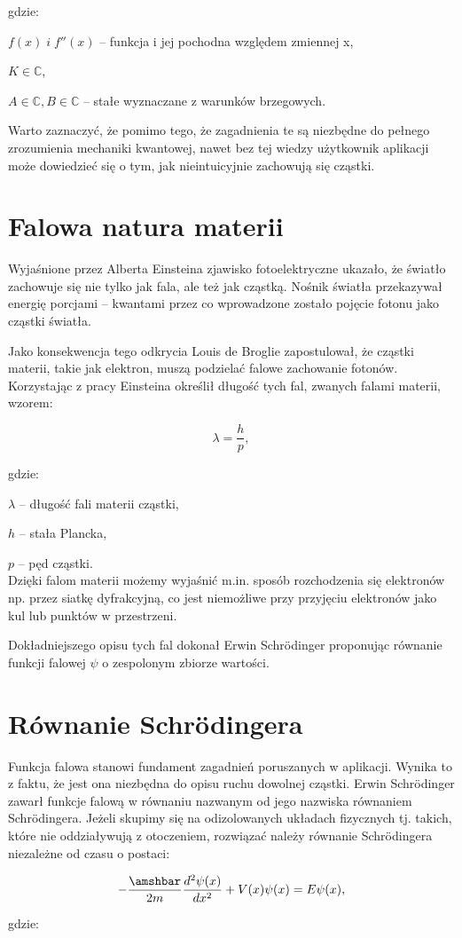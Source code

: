 \documentclass{SGGW-thesis}
\begin{document}
	gdzie:
	
	$f(x) \; i \; f''(x)$ -- funkcja i jej pochodna względem zmiennej x,

	$K \in \mathbb{C}$,
		
	$A \in \mathbb{C}, B \in \mathbb{C}$ -- stałe wyznaczane z warunków brzegowych.
	
	

	Warto zaznaczyć, że pomimo tego, że zagadnienia te są niezbędne do pełnego zrozumienia mechaniki kwantowej, nawet bez tej wiedzy użytkownik aplikacji może dowiedzieć się o tym, jak nieintuicyjnie zachowują się cząstki.
	\section{Falowa natura materii}
	Wyjaśnione przez Alberta Einsteina zjawisko fotoelektryczne ukazało, że światło zachowuje się nie tylko jak fala, ale też jak cząstką\cite{foto-ele}. Nośnik światła przekazywał energię porcjami -- kwantami przez co wprowadzone zostało pojęcie fotonu jako cząstki światła.
	
	 Jako konsekwencja tego odkrycia Louis de Broglie zapostulował, że cząstki materii, takie jak elektron, muszą podzielać falowe zachowanie fotonów. Korzystając z pracy Einsteina określił długość tych fal\cite{matter-wave}, zwanych falami materii, wzorem:
	 
	 \begin{equation}
	 \lambda=\frac{h}{p},
	 \end{equation}
	
	 
	 gdzie:
	 
	 $\lambda$ -- długość fali materii cząstki,
	 
	 $h$ -- stała Plancka,
	 
	 $p$ -- pęd cząstki.\\
	 
	 Dzięki falom materii możemy wyjaśnić m.in. sposób rozchodzenia się elektronów np. przez siatkę dyfrakcyjną, co jest niemożliwe przy przyjęciu elektronów jako kul lub punktów w przestrzeni.
	 
	 Dokładniejszego opisu tych fal dokonał Erwin Schrödinger proponując równanie funkcji falowej $\psi$ o zespolonym zbiorze wartości. 
	 
	\section{Równanie Schrödingera}
	Funkcja falowa stanowi fundament zagadnień poruszanych w aplikacji. Wynika to z faktu, że jest ona niezbędna do opisu ruchu dowolnej cząstki. Erwin Schrödinger zawarł funkcje falową w równaniu nazwanym od jego nazwiska równaniem Schrödingera\cite{schrodinger-equation}.  Jeżeli skupimy się na odizolowanych układach fizycznych tj. takich, które nie oddziaływują z otoczeniem, rozwiązać należy równanie Schrödingera niezależne od czasu o postaci:
	\begin{center}
	\begin{equation}
		-\frac{\amshbar}{2m} \frac{d^2\psi(x)}{dx^2} + V(x)\psi(x) = E\psi(x),
	\end{equation}
	\end{center}
	gdzie:
	
\end{document}
